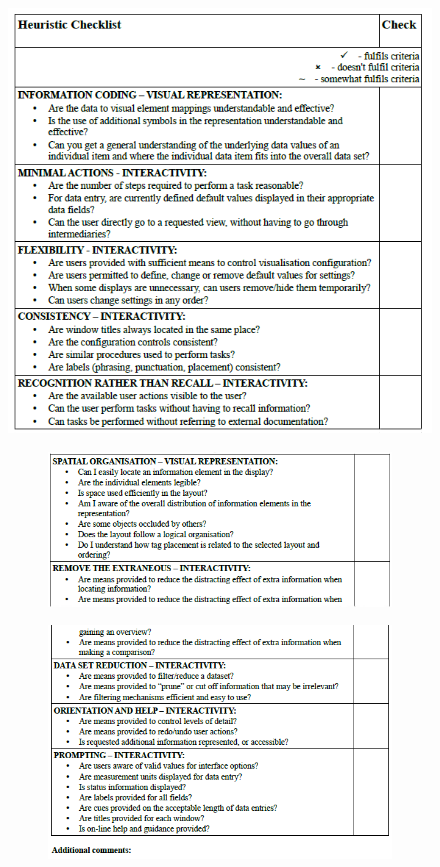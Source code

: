 \begin{figure}[!htb]
	\includegraphics{checklist1.png}
\end{figure}

\begin{figure}[!htb]
\begin{subfigure}{\textwidth}
	\includegraphics{checklist2.png}
\end{subfigure}
\begin{subfigure}{\textwidth}
	\includegraphics{checklist3.png}
\end{subfigure}
\end{figure}
%


